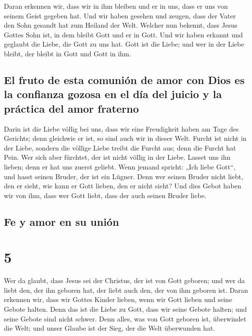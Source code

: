  Daran erkennen wir, dass wir in ihm bleiben und er in
uns, dass er uns von seinem Geist gegeben hat.  Und wir
haben gesehen und zeugen, dass der Vater den Sohn gesandt hat zum
Heiland der Welt.  Welcher nun bekennt, dass Jesus Gottes
Sohn ist, in dem bleibt Gott und er in Gott.  Und wir
haben erkannt und geglaubt die Liebe, die Gott zu uns hat. Gott ist die
Liebe; und wer in der Liebe bleibt, der bleibt in Gott und Gott in ihm.

\hypertarget{el-fruto-de-esta-comuniuxf3n-de-amor-con-dios-es-la-confianza-gozosa-en-el-duxeda-del-juicio-y-la-pruxe1ctica-del-amor-fraterno}{%
\subsection{El fruto de esta comunión de amor con Dios es la confianza
gozosa en el día del juicio y la práctica del amor
fraterno}\label{el-fruto-de-esta-comuniuxf3n-de-amor-con-dios-es-la-confianza-gozosa-en-el-duxeda-del-juicio-y-la-pruxe1ctica-del-amor-fraterno}}

 Darin ist die Liebe völlig bei uns, dass wir eine
Freudigkeit haben am Tage des Gerichts; denn gleichwie er ist, so sind
auch wir in dieser Welt.  Furcht ist nicht in der Liebe,
sondern die völlige Liebe treibt die Furcht aus; denn die Furcht hat
Pein. Wer sich aber fürchtet, der ist nicht völlig in der Liebe.
 Lasset uns ihn lieben; denn er hat uns zuerst geliebt.
 Wenn jemand spricht: „Ich liebe Gott``, und hasst seinen
Bruder, der ist ein Lügner. Denn wer seinen Bruder nicht liebt, den er
sieht, wie kann er Gott lieben, den er nicht sieht?  Und
dies Gebot haben wir von ihm, dass wer Gott liebt, dass der auch seinen
Bruder liebe.

\hypertarget{fe-y-amor-en-su-uniuxf3n}{%
\subsection{Fe y amor en su unión}\label{fe-y-amor-en-su-uniuxf3n}}

\hypertarget{section-4}{%
\section{5}\label{section-4}}

 Wer da glaubt, dass Jesus sei der Christus, der ist von
Gott geboren; und wer da liebt den, der ihn geboren hat, der liebt auch
den, der von ihm geboren ist.  Daran erkennen wir, dass
wir Gottes Kinder lieben, wenn wir Gott lieben und seine Gebote halten.
 Denn das ist die Liebe zu Gott, dass wir seine Gebote
halten; und seine Gebote sind nicht schwer.  Denn alles,
was von Gott geboren ist, überwindet die Welt; und unser Glaube ist der
Sieg, der die Welt überwunden hat.

